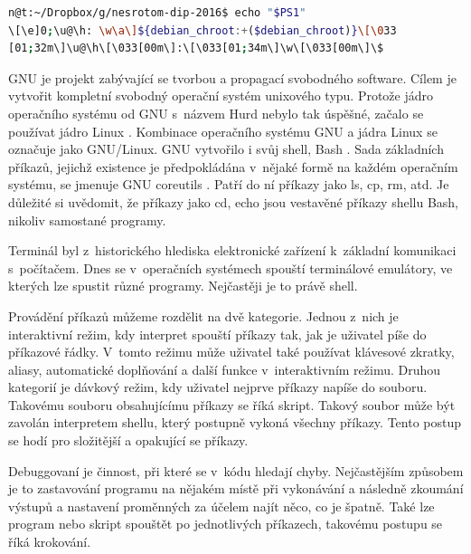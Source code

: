 \documentclass[thesis=M,czech]{FITthesis}[2012/06/26]
\begin{document}
\begin{minipage}{\linewidth}
\begin{lstlisting}[language=bash, caption={Prompt v~shellu}, label={lst:prompt}]
n@t:~/Dropbox/g/nesrotom-dip-2016$ echo "$PS1"
\[\e]0;\u@\h: \w\a\]${debian_chroot:+($debian_chroot)}\[\033
[01;32m\]\u@\h\[\033[00m\]:\[\033[01;34m\]\w\[\033[00m\]\$
\end{lstlisting}
\end{minipage}



GNU \cite{gnu} je projekt zabývající se tvorbou a propagací svobodného software. Cílem je vytvořit kompletní svobodný operační systém unixového typu. Protože jádro operačního systému od GNU s~názvem Hurd \cite{hurd} nebylo tak úspěšné, začalo se používat jádro Linux \cite{linuxkernel}. Kombinace operačního systému GNU a jádra Linux se označuje jako GNU/Linux. GNU vytvořilo i svůj shell, Bash \cite{bash}. Sada základních příkazů, jejichž existence je předpokládána v~nějaké formě na každém operačním systému, se jmenuje GNU coreutils \cite{coreutils}. Patří do ní příkazy jako ls, cp, rm, atd. Je důležité si uvědomit, že příkazy jako cd, echo jsou vestavěné příkazy shellu Bash, nikoliv samostané programy.


Terminál byl z~historického hlediska elektronické zařízení k~základní komunikaci s~počítačem. Dnes se v~operačních systémech spouští terminálové emulátory, ve kterých lze spustit různé programy. Nejčastěji je to právě shell.


Provádění příkazů můžeme rozdělit na dvě kategorie. Jednou z~nich je interaktivní režim, kdy interpret spouští příkazy tak, jak je uživatel píše do příkazové řádky. V~tomto režimu může uživatel také používat klávesové zkratky, aliasy, automatické doplňování a další funkce v~interaktivním režimu. Druhou kategorií je dávkový režim, kdy uživatel nejprve příkazy napíše do souboru. Takovému souboru obsahujícímu příkazy se říká skript. Takový soubor může být zavolán interpretem shellu, který postupně vykoná všechny příkazy. Tento postup se hodí pro složitější a opakující se příkazy.


Debuggovaní je činnost, při které se v~kódu hledají chyby. Nejčastějším způsobem je to zastavování programu na nějakém místě při vykonávání a následně zkoumání výstupů a nastavení proměnných za účelem najít něco, co je špatně. Také lze program nebo skript spouštět po jednotlivých příkazech, takovému postupu se říká krokování.
\end{document}
